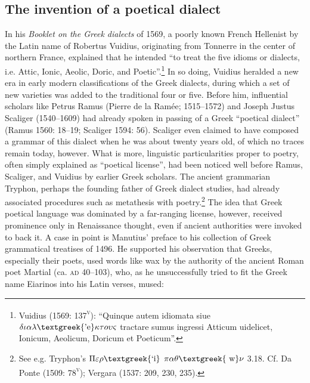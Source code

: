 \subsection{The invention of a poetical dialect}
\hypertarget{Toc19704813}{}\begin{styleStandard}
In his \textit{Booklet on the Greek dialects} of 1569, a poorly known French Hellenist by the Latin name of Robertus Vuidius, originating from Tonnerre in the center of northern France, explained that he intended “to treat the five idioms or dialects, i.e. Attic, Ionic, Aeolic, Doric, and Poetic”.\footnote{ Vuidius (1569: 137\textsc{\textsuperscript{v}}): “Quinque autem idiomata siue $\delta \iota \alpha \lambda \text{\textgreek{'e}}\kappa \tau o\upsilon \varsigma $ tractare sumus ingressi Atticum uidelicet, Ionicum, Aeolicum, Doricum et Poeticum”.} In so doing, Vuidius heralded a new era in early modern classifications of the Greek dialects, during which a set of new varieties was added to the traditional four or five. Before him, influential scholars like Petrus Ramus (Pierre de la Ramée; 1515–1572) and Joseph Justus Scaliger (1540–1609) had already spoken in passing of a Greek “poetical dialect” (Ramus 1560: 18–19; Scaliger 1594: 56). Scaliger even claimed to have composed a grammar of this dialect when he was about twenty years old, of which no traces remain today, however. What is more, linguistic particularities proper to poetry, often simply explained as “poetical license”, had been noticed well before Ramus, Scaliger, and Vuidius by earlier Greek scholars. The ancient grammarian Tryphon, perhaps the founding father of Greek dialect studies, had already associated procedures such as metathesis with poetry.\footnote{ See e.g. Tryphon’s $\Pi \varepsilon \rho \text{\textgreek{`i}}$ $\pi \alpha \theta \text{\textgreek{~w}}\nu $ 3.18. Cf. Da Ponte (1509: 78\textsc{\textsuperscript{v}}); Vergara (1537: 209, 230, 235).} The idea that Greek poetical language was dominated by a far-ranging license, however, received prominence only in Renaissance thought, even if ancient authorities were invoked to back it. A case in point is Manutius’ preface to his collection of Greek grammatical treatises of 1496. He supported his observation that Greeks, especially their poets, used words like wax by the authority of the ancient Roman poet Martial (ca. \textsc{ad} 40–103), who, as he unsuccessfully tried to fit the Greek name Eiarinos into his Latin verses, mused:
\end{styleStandard}

